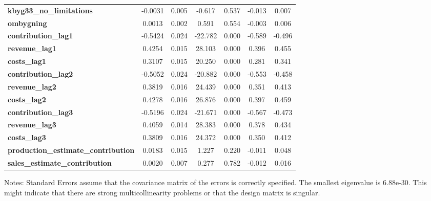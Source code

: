 \begin{center}
\begin{tabular}{lcccccc}
\textbf{kbyg33\_no\_limitations}            &      -0.0031  &        0.005     &    -0.617  &         0.537        &       -0.013    &        0.007     \\
\textbf{ombygning}                          &       0.0013  &        0.002     &     0.591  &         0.554        &       -0.003    &        0.006     \\
\textbf{contribution\_lag1}                 &      -0.5424  &        0.024     &   -22.782  &         0.000        &       -0.589    &       -0.496     \\
\textbf{revenue\_lag1}                      &       0.4254  &        0.015     &    28.103  &         0.000        &        0.396    &        0.455     \\
\textbf{costs\_lag1}                        &       0.3107  &        0.015     &    20.250  &         0.000        &        0.281    &        0.341     \\
\textbf{contribution\_lag2}                 &      -0.5052  &        0.024     &   -20.882  &         0.000        &       -0.553    &       -0.458     \\
\textbf{revenue\_lag2}                      &       0.3819  &        0.016     &    24.439  &         0.000        &        0.351    &        0.413     \\
\textbf{costs\_lag2}                        &       0.4278  &        0.016     &    26.876  &         0.000        &        0.397    &        0.459     \\
\textbf{contribution\_lag3}                 &      -0.5196  &        0.024     &   -21.671  &         0.000        &       -0.567    &       -0.473     \\
\textbf{revenue\_lag3}                      &       0.4059  &        0.014     &    28.383  &         0.000        &        0.378    &        0.434     \\
\textbf{costs\_lag3}                        &       0.3809  &        0.016     &    24.372  &         0.000        &        0.350    &        0.412     \\
\textbf{production\_estimate\_contribution} &       0.0183  &        0.015     &     1.227  &         0.220        &       -0.011    &        0.048     \\
\textbf{sales\_estimate\_contribution}      &       0.0020  &        0.007     &     0.277  &         0.782        &       -0.012    &        0.016     \\
\bottomrule
\end{tabular}
\end{center}

Notes: \newline
 [1] Standard Errors assume that the covariance matrix of the errors is correctly specified. \newline
 [2] The smallest eigenvalue is 6.88e-30. This might indicate that there are \newline
 strong multicollinearity problems or that the design matrix is singular.